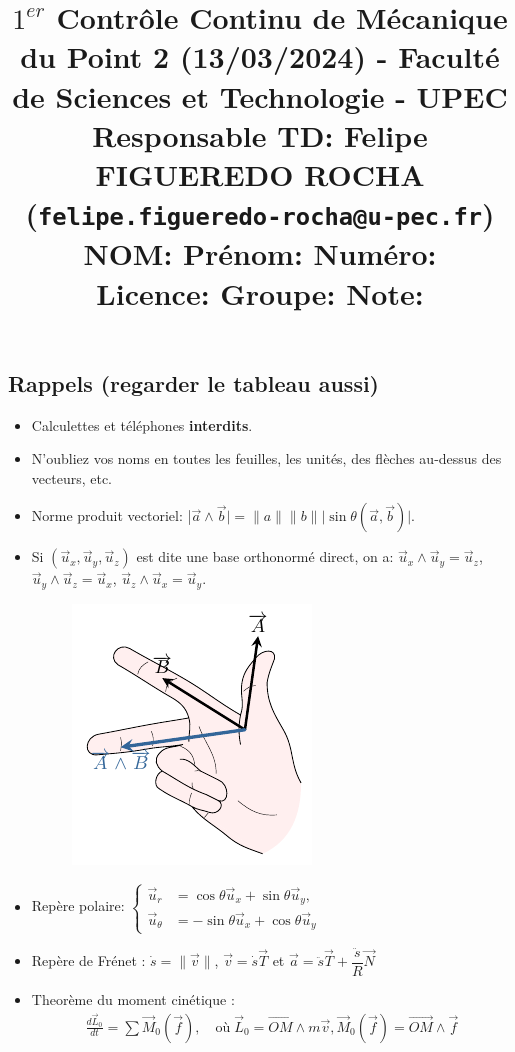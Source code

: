 \documentclass[french,10pt,twocolumn]{article}
\title{\vspace{-1cm} \large $1^{er}$ Contrôle Continu de Mécanique du Point 2 (13/03/2024) - 	Faculté de Sciences et Technologie - UPEC \\ 	Responsable TD: Felipe FIGUEREDO ROCHA (\texttt{felipe.figueredo-rocha@u-pec.fr}) \\
	NOM:\underline{\hspace{7cm}} Prénom: \underline{\hspace{5cm}}  Numéro: \underline{\hspace{2cm}} \\
	Licence:\underline{\hspace{7cm}} Groupe: \underline{\hspace{5cm}} Note: \underline{\hspace{1.5cm}}
	\vspace{-2cm}}
\author{}
\date{}
\begin{document}
	\maketitle
	
	\vspace{-0.5cm}
	\subsection*{Rappels (regarder le tableau aussi)}
	\begin{itemize}
		\item Calculettes et téléphones \textbf{interdits}.
		\item N'oubliez vos noms en toutes les feuilles, les unités, des flèches au-dessus des vecteurs, etc.
		\item Norme produit vectoriel: |$\vec{a} \wedge \vec{b}| =  \|a\| \|b\| |\sin{\theta}(\vec{a}, \vec{b})|$.
		\item Si $(\vec{u}_x, \vec{u}_y, \vec{u}_z)$ est dite une base orthonormé direct, on a: $\vec{u}_x \wedge \vec{u}_y = \vec{u}_z$, $\vec{u}_y \wedge \vec{u}_z = \vec{u}_x$, $\vec{u}_z \wedge \vec{u}_x = \vec{u}_y$.
		\begin{figure}[h!]
			\centering
			\includegraphics[width=0.3\linewidth]{regle_de_la_main_droite}
			\caption*{}
			\label{fig:regledelamaindroite}
		\end{figure}
		\vspace{-1cm}
		\item Repère polaire:
		$ \begin{cases}
			\vec{u}_r &= \cos{\theta} \Vec{u}_x + \sin{\theta} \Vec{u}_y,\\ 
			\vec{u}_{\theta} &= -\sin{\theta} \vec{u}_x + \cos{\theta} \Vec{u}_y
		\end{cases}
		$ 	
		\item Repère de Frénet : $\dot{s} = \|\vec{v}\|$, $\vec{v} = \dot{s} \vec{T}$ et 
		$\vec{a} = \ddot{s} \vec{T} + \dfrac{\ddot{s}}{R} \vec{N}$
		\item Theorème du moment cinétique :
		\begin{align*}
			\frac{d \vec{L}_0}{d t} = \sum \vec{M}_0(\vec{f}), \quad \text{où} \; \vec{L}_0 = \vec{OM}\wedge m\vec{v}, \vec{M}_0(\vec{f}) = \vec{OM}\wedge \vec{f}
		\end{align*}
	\end{itemize}
	
\end{document}
